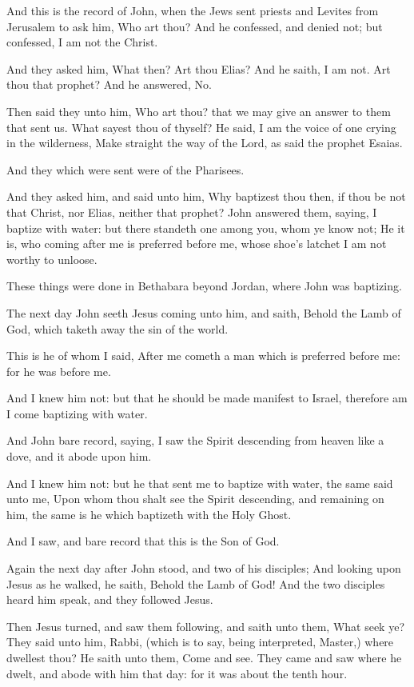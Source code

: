 \verse And this is the record of John, when the Jews sent priests and Levites from Jerusalem to ask him, Who art thou?  \verse And he confessed, and denied not; but confessed, I am not the Christ.

\verse And they asked him, What then? Art thou Elias? And he saith, I am not. Art thou that prophet? And he answered, No.

\verse Then said they unto him, Who art thou? that we may give an answer to them that sent us. What sayest thou of thyself?  \verse He said, I am the voice of one crying in the wilderness, Make straight the way of the Lord, as said the prophet Esaias.

\verse And they which were sent were of the Pharisees.

\verse And they asked him, and said unto him, Why baptizest thou then, if thou be not that Christ, nor Elias, neither that prophet?  \verse John answered them, saying, I baptize with water: but there standeth one among you, whom ye know not; \verse He it is, who coming after me is preferred before me, whose shoe's latchet I am not worthy to unloose.

\verse These things were done in Bethabara beyond Jordan, where John was baptizing.

\verse The next day John seeth Jesus coming unto him, and saith, Behold the Lamb of God, which taketh away the sin of the world.

\verse This is he of whom I said, After me cometh a man which is preferred before me: for he was before me.

\verse And I knew him not: but that he should be made manifest to Israel, therefore am I come baptizing with water.

\verse And John bare record, saying, I saw the Spirit descending from heaven like a dove, and it abode upon him.

\verse And I knew him not: but he that sent me to baptize with water, the same said unto me, Upon whom thou shalt see the Spirit descending, and remaining on him, the same is he which baptizeth with the Holy Ghost.

\verse And I saw, and bare record that this is the Son of God.

\verse Again the next day after John stood, and two of his disciples; \verse And looking upon Jesus as he walked, he saith, Behold the Lamb of God!  \verse And the two disciples heard him speak, and they followed Jesus.

\verse Then Jesus turned, and saw them following, and saith unto them, What seek ye? They said unto him, Rabbi, (which is to say, being interpreted, Master,) where dwellest thou?  \verse He saith unto them, Come and see. They came and saw where he dwelt, and abode with him that day: for it was about the tenth hour.

